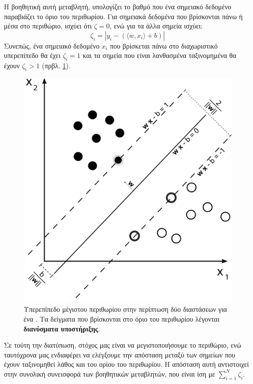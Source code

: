 Η βοηθητική αυτή μεταβλητή, υπολογίζει το βαθμό που ένα σημειακό δεδομένο παραβιάζει το όριο του περιθωρίου.
Για σημειακά δεδομένα που βρίσκονται πάνω ή μέσα στο περιθώριο, ισχύει ότι $\zeta = 0$, ενώ για τα άλλα σημεία ισχύει:
\begin{equation}
\zeta_{i} = | y_{i} - (\langle w, x_{i} \rangle + b )|    
\end{equation}
Συνεπώς, ένα σημειακό δεδομένο $x_{i}$ που βρίσκεται πάνω στο διαχωριστικό υπερεπίπεδο θα έχει $\zeta_{i} = 1$ και τα σημεία που είναι λανθασμένα ταξινομημένα θα έχουν $\zeta_{i} > 1$ (πρβλ. \ref{fig:svm_sep}).
\begin{figure}
    \centering
    \includegraphics[scale=0.6]{figures/556px-Svm_max_sep_hyperplane_with_margin.png}
    \caption{Υπερεπίπεδο μέγιστου περιθωρίου στην περίπτωση δύο διαστάσεων για ένα . Τα δείγματα που βρίσκονται στο όριο του περιθωρίου λέγονται \textbf{διανύσματα υποστήριξης}.}
    \label{fig:svm_sep}
\end{figure}
Σε τούτη την διατύπωση, στόχος μας είναι να μεγιστοποιήσουμε το περιθώριο, ενώ ταυτόχρονα μας ενδιαφέρει να ελέγξουμε την απόσταση μεταξύ των σημείων που έχουν ταξινομηθεί λάθος και του ορίου του περιθωρίου.
Η απόσταση αυτή αντιστοιχεί στην συνολική συνεισφορά των βοηθητικών μεταβλητών, που είναι ίση με $\sum_{i=1}^{N} \zeta_{i}$.
